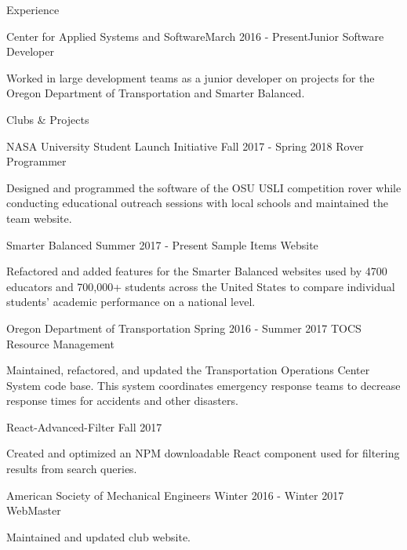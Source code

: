 \documentclass{resume} %
\begin{document}
\begin{rSection}{Experience}

  \begin{rSubsection}{Center for Applied Systems and Software}{March 2016 - Present}{Junior Software Developer}{}
  \item Worked in large development teams as a junior developer on projects for the Oregon  Department of Transportation and Smarter Balanced.
  \end{rSubsection}

\end{rSection}


\begin{rSection}{Clubs \& Projects}
  
    
  \begin{rSubsection} {NASA University Student Launch Initiative} {Fall 2017 - Spring 2018} {Rover Programmer} {}
  \item Designed and programmed the software of the OSU USLI competition rover while conducting educational outreach sessions with local schools and maintained the team website.
  \end{rSubsection}

  \begin{rSubsection} {Smarter Balanced} {Summer 2017 - Present} {Sample Items Website} {}
  \item Refactored and added features for the Smarter Balanced websites used by 4700 educators and 700,000+ students across the United States to compare individual students' academic performance on a national level.
  \end{rSubsection}

  \begin{rSubsection} {Oregon Department of Transportation} {Spring 2016 - Summer 2017} {TOCS Resource Management} {}
  \item Maintained, refactored, and updated the Transportation Operations Center System code base. This system coordinates emergency response teams to decrease response times for accidents and other disasters.
  \end{rSubsection}

  \begin{rSubsection} {React-Advanced-Filter} {Fall 2017} {} {}
  \item Created and optimized an NPM downloadable React component used for filtering results from search queries.
  \end{rSubsection}

  \begin{rSubsection} {American Society of Mechanical Engineers} {Winter 2016 - Winter 2017} {WebMaster} {}
  \item Maintained and updated club website.
  \end{rSubsection}

\end{rSection}
\end{document}
